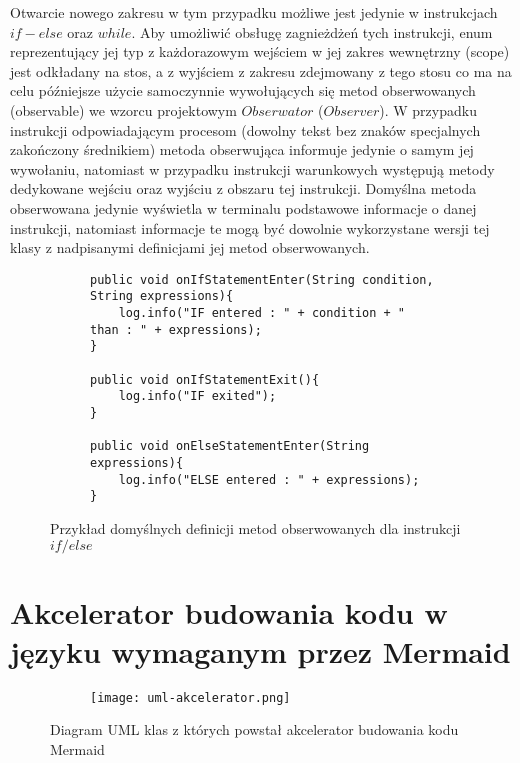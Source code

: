 	 Otwarcie nowego zakresu w tym przypadku możliwe jest jedynie w instrukcjach $if - else$ oraz $while$. Aby umożliwić obsługę zagnieżdżeń tych instrukcji, enum reprezentujący jej typ z każdorazowym wejściem w jej zakres wewnętrzny (scope) jest odkładany na stos, a z wyjściem z zakresu zdejmowany z tego stosu co ma na celu późniejsze użycie samoczynnie wywołujących się metod obserwowanych (observable) we wzorcu projektowym $Obserwator$ ($Observer$). W przypadku instrukcji odpowiadającym procesom (dowolny tekst bez znaków specjalnych zakończony średnikiem) metoda obserwująca informuje jedynie o samym jej wywołaniu, natomiast w przypadku instrukcji warunkowych występują metody dedykowane wejściu oraz wyjściu z obszaru tej instrukcji. Domyślna metoda obserwowana jedynie wyświetla w terminalu podstawowe informacje o danej instrukcji, natomiast informacje te mogą być dowolnie wykorzystane wersji tej klasy z nadpisanymi definicjami jej metod obserwowanych. 
						
\begin{figure}[H]
  \begin{subfigure}{\textwidth}
		\begin{verbatim}
public void onIfStatementEnter(String condition, String expressions){
	log.info("IF entered : " + condition + " than : " + expressions);
}

public void onIfStatementExit(){
	log.info("IF exited");
}

public void onElseStatementEnter(String expressions){
	log.info("ELSE entered : " + expressions);
}
		\end{verbatim}
  \end{subfigure}\hfill
  \caption{Przykład domyślnych definicji metod obserwowanych dla instrukcji $if/else$}
\end{figure}



\section{Akcelerator budowania kodu w języku wymaganym przez Mermaid}

\begin{figure}[H]
  \begin{subfigure}{\textwidth}
  	\centering
    \texttt{[image: uml-akcelerator.png]}
  \end{subfigure}\hfill
  \caption{Diagram UML klas z których powstał akcelerator budowania kodu Mermaid }
\end{figure}

